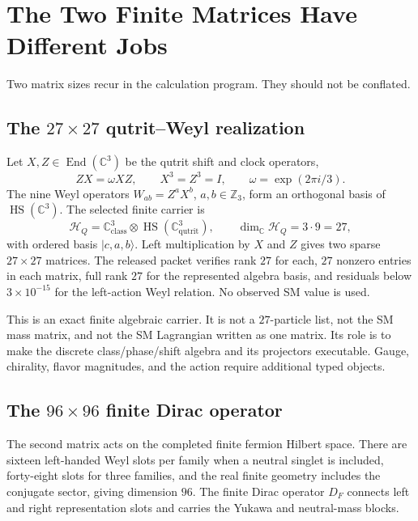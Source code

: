 \documentclass[11pt]{article}
\newcommand{\C}{\mathbb{C}}
\newcommand{\Z}{\mathbb{Z}}
\newcommand{\cH}{\mathcal{H}}
\newcommand{\End}{\operatorname{End}}
\begin{document}
\section{The Two Finite Matrices Have Different Jobs}

Two matrix sizes recur in the calculation program.  They should not be conflated.

\subsection{The \texorpdfstring{$27\times27$}{27 by 27} qutrit--Weyl realization}

Let $X,Z\in\End(\C^3)$ be the qutrit shift and clock operators,
\begin{equation}
ZX=\omega XZ,\qquad X^3=Z^3=I,\qquad
\omega=\exp(2\pi i/3).
\end{equation}
The nine Weyl operators $W_{ab}=Z^aX^b$, $a,b\in\Z_3$, form an orthogonal basis of
$\operatorname{HS}(\C^3)$.  The selected finite carrier is
\begin{equation}
\cH_Q=\C^3_{\mathrm{class}}\otimes\operatorname{HS}(\C^3_{\mathrm{qutrit}}),
\qquad \dim_{\C}\cH_Q=3\cdot9=27,
\end{equation}
with ordered basis $|c,a,b\rangle$.  Left multiplication by $X$ and $Z$ gives two sparse
$27\times27$ matrices.  The released packet verifies rank $27$ for each, $27$ nonzero entries
in each matrix, full rank $27$ for the represented algebra basis, and residuals below
$3\times10^{-15}$ for the left-action Weyl relation.  No observed SM value is used.

This is an exact finite algebraic carrier.  It is not a $27$-particle list, not the SM mass
matrix, and not the SM Lagrangian written as one matrix.  Its role is to make the discrete
class/phase/shift algebra and its projectors executable.  Gauge, chirality, flavor magnitudes,
and the action require additional typed objects.

\subsection{The \texorpdfstring{$96\times96$}{96 by 96} finite Dirac operator}

The second matrix acts on the completed finite fermion Hilbert space.  There are sixteen
left-handed Weyl slots per family when a neutral singlet is included, forty-eight slots for
three families, and the real finite geometry includes the conjugate sector, giving dimension
$96$.  The finite Dirac operator $D_F$ connects left and right representation slots and carries
the Yukawa and neutral-mass blocks.
\end{document}
